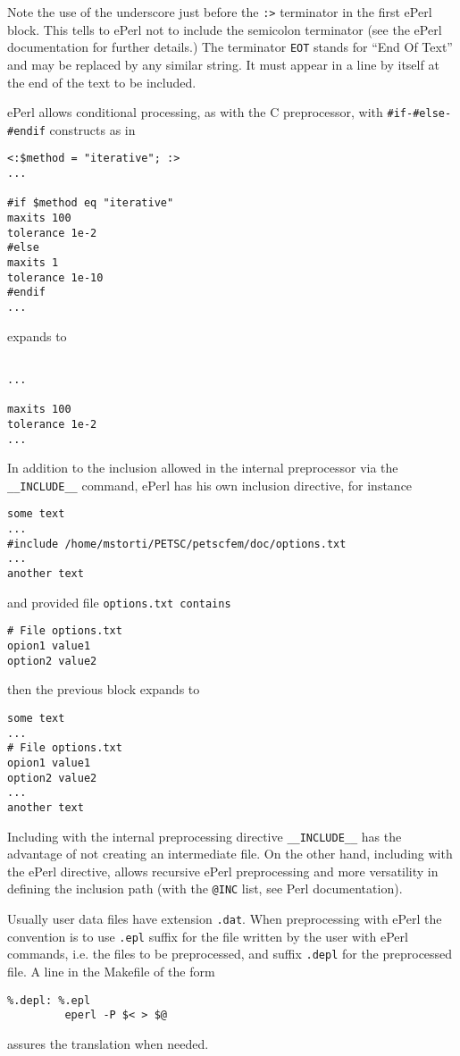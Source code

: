 Note the use of the underscore just before the \verb+:>+ terminator in
the first ePerl block. This tells to ePerl not to include the
semicolon terminator (see the ePerl documentation for further
details.) The terminator \verb+EOT+ stands for ``End Of Text'' and may
be replaced by any similar string. It must appear in a line by itself
at the end of the text to be included. 


%
ePerl allows conditional processing, as with the C preprocessor, with
\verb+#if-#else-#endif+ constructs as in
%
\begin{verbatim}
<:$method = "iterative"; :>
...

#if $method eq "iterative"
maxits 100
tolerance 1e-2
#else
maxits 1
tolerance 1e-10
#endif
...
\end{verbatim}
%
expands to
%
\begin{verbatim}

...

maxits 100
tolerance 1e-2
...
\end{verbatim}


%
In addition to the inclusion allowed in the internal preprocessor via
the \verb+__INCLUDE__+ command, ePerl has his own inclusion directive,
for instance
%
\begin{verbatim}
some text
...
#include /home/mstorti/PETSC/petscfem/doc/options.txt
...
another text
\end{verbatim}
%
and provided file \verb+options.txt contains+ 
%
\begin{verbatim}
# File options.txt
opion1 value1
option2 value2
\end{verbatim}
%
then the previous block expands to
%
\begin{verbatim}
some text
...
# File options.txt
opion1 value1
option2 value2
...
another text
\end{verbatim}
%
Including with the internal preprocessing directive \verb+__INCLUDE__+
has the advantage of not creating an intermediate file. On the other
hand, including with the ePerl directive, allows recursive ePerl
preprocessing and more versatility in defining the inclusion path
(with the \verb+@INC+ list, see Perl documentation). 


%
Usually user data files have extension \verb+.dat+. When preprocessing
with ePerl the convention is to use \verb+.epl+ suffix for the file
written by the user with ePerl commands, i.e. the files to be
preprocessed, and suffix \verb+.depl+ for the preprocessed file. 
A line in the Makefile of the form
%
\begin{verbatim}
%.depl: %.epl
         eperl -P $< > $@
\end{verbatim}
%
assures the translation when needed. 

